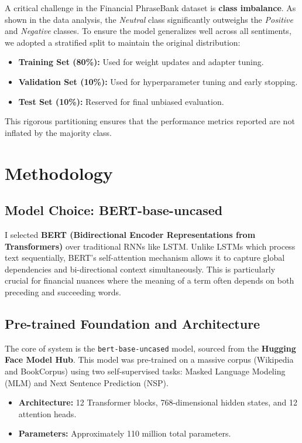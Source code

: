 \documentclass[a4paper, 12pt, twoside]{article}
\begin{document}
A critical challenge in the Financial PhraseBank dataset is \textbf{class imbalance}. As shown in the data analysis, the \textit{Neutral} class significantly outweighs the \textit{Positive} and \textit{Negative} classes. To ensure the model generalizes well across all sentiments, we adopted a stratified split to maintain the original distribution:
\begin{itemize}
    \item \textbf{Training Set (80\%):} Used for weight updates and adapter tuning.
    \item \textbf{Validation Set (10\%):} Used for hyperparameter tuning and early stopping.
    \item \textbf{Test Set (10\%):} Reserved for final unbiased evaluation.
\end{itemize}

This rigorous partitioning ensures that the performance metrics reported are not inflated by the majority class.
\section{Methodology}
\subsection{Model Choice: BERT-base-uncased}
I selected \textbf{BERT (Bidirectional Encoder Representations from Transformers)} over traditional RNNs like LSTM. Unlike LSTMs which process text sequentially, BERT's self-attention mechanism allows it to capture global dependencies and bi-directional context simultaneously. This is particularly crucial for financial nuances where the meaning of a term often depends on both preceding and succeeding words.
\subsection{Pre-trained Foundation and Architecture}
The core of system is the \texttt{bert-base-uncased} model, sourced from the \textbf{Hugging Face Model Hub}. This model was pre-trained on a massive corpus (Wikipedia and BookCorpus) using two self-supervised tasks: Masked Language Modeling (MLM) and Next Sentence Prediction (NSP).
\begin{itemize}
    \item \textbf{Architecture:} 12 Transformer blocks, 768-dimensional hidden states, and 12 attention heads.
    \item \textbf{Parameters:} Approximately 110 million total parameters.
\end{itemize}
\end{document}

